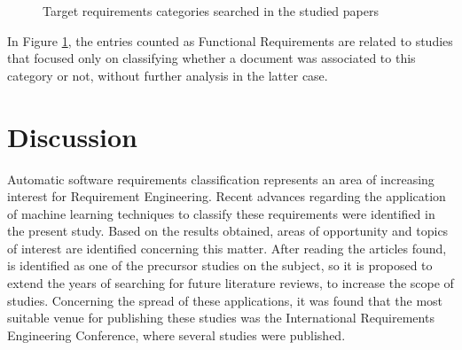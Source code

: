 \documentclass[conference]{IEEEtran}
\begin{document}
\begin{figure}[!htbp]
    \caption{\label{fig:categories_freq}Target requirements categories searched in the studied papers}
    
\end{figure}

In Figure \ref{fig:categories_freq}, the entries counted as Functional Requirements are related to studies that focused only on classifying whether a document was associated to this category or not, without further analysis in the latter case.

\section{Discussion}
\label{discussion}

Automatic software requirements classification represents an area of increasing interest for Requirement Engineering. Recent advances regarding the application of machine learning techniques to classify these requirements were identified in the present study. Based on the results obtained, areas of opportunity and topics of interest are identified concerning this matter. After reading the articles found, \cite{Cleland-Huang2006} is identified as one of the precursor studies on the subject, so it is proposed to extend the years of searching for future literature reviews, to increase the scope of studies. Concerning the spread of these applications, it was found that the most suitable venue for publishing these studies was the International Requirements Engineering Conference, where several studies were published.
\end{document}
